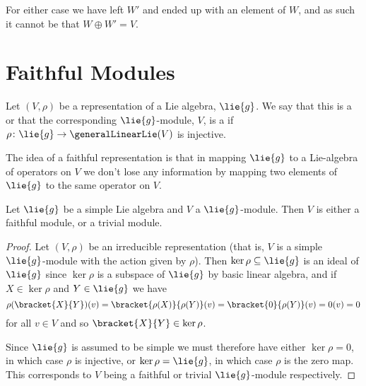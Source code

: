 \documentclass[fleqn]{NotesClass}
\begin{document}
    For either case we have left \(W'\) and ended up with an element of \(W\), and as such it cannot be that \(W \oplus W' = V\).
    
    \section{Faithful Modules}
    \begin{dfn}{}{}
        Let \((V, \rho)\) be a representation of a Lie algebra, \(\lie{g}\).
        We say that this is a  or that the corresponding \(\lie{g}\)-module, \(V\), is a  if \(\rho \colon \lie{g} \to \generalLinearLie(V)\) is injective.
    \end{dfn}
    
    The idea of a faithful representation is that in mapping \(\lie{g}\) to a Lie-algebra of operators on \(V\) we don't lose any information by mapping two elements of \(\lie{g}\) to the same operator on \(V\).
    
    \begin{lma}{}{}
        Let \(\lie{g}\) be a simple Lie algebra and \(V\) a \(\lie{g}\)-module.
        Then \(V\) is either a faithful module, or a trivial module.
        \begin{proof}
            Let \((V, \rho)\) be an irreducible representation (that is, \(V\) is a simple \(\lie{g}\)-module with the action given by \(\rho\)).
            Then \(\ker \rho \subseteq \lie{g}\) is an ideal of \(\lie{g}\) since \(\ker \rho\) is a subspace of \(\lie{g}\) by basic linear algebra, and if \(X \in \ker \rho\) and \(Y \in \lie{g}\) we have
            \begin{equation}
                \rho(\bracket{X}{Y})(v) = \bracket{\rho(X)}{\rho(Y)}(v) = \bracket{0}{\rho(Y)}(v) = 0(v) = 0
            \end{equation}
            for all \(v \in V\) and so \(\bracket{X}{Y} \in \ker \rho\).
            
            Since \(\lie{g}\) is assumed to be simple we must therefore have either \(\ker \rho = 0\), in which case \(\rho\) is injective, or \(\ker \rho = \lie{g}\), in which case \(\rho\) is the zero map.
            This corresponds to \(V\) being a faithful or trivial \(\lie{g}\)-module respectively.
        \end{proof}
    \end{lma}
    
\end{document}

